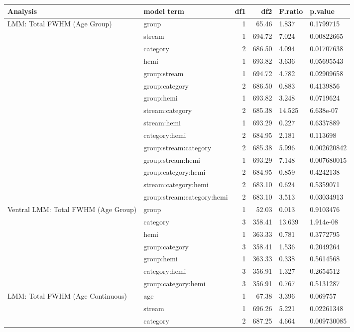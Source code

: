 \begin{table}
\centering
\begin{tabular}{llrrll}
\toprule
Analysis & model term & df1 & df2 & F.ratio & p.value\\
\midrule
LMM: Total FWHM (Age Group) & group & 1 & 65.46 & 1.837 & 0.1799715\\
 & stream & 1 & 694.72 & 7.024 & 0.00822665\\
 & category & 2 & 686.50 & 4.094 & 0.01707638\\
 & hemi & 1 & 693.82 & 3.636 & 0.05695543\\
 & group:stream & 1 & 694.72 & 4.782 & 0.02909658\\
\addlinespace
 & group:category & 2 & 686.50 & 0.883 & 0.4139856\\
 & group:hemi & 1 & 693.82 & 3.248 & 0.0719624\\
 & stream:category & 2 & 685.38 & 14.525 & 6.638e-07\\
 & stream:hemi & 1 & 693.29 & 0.227 & 0.6337889\\
 & category:hemi & 2 & 684.95 & 2.181 & 0.113698\\
\addlinespace
 & group:stream:category & 2 & 685.38 & 5.996 & 0.002620842\\
 & group:stream:hemi & 1 & 693.29 & 7.148 & 0.007680015\\
 & group:category:hemi & 2 & 684.95 & 0.859 & 0.4242138\\
 & stream:category:hemi & 2 & 683.10 & 0.624 & 0.5359071\\
 & group:stream:category:hemi & 2 & 683.10 & 3.513 & 0.03034913\\
\addlinespace
Ventral LMM: Total FWHM (Age Group) & group & 1 & 52.03 & 0.013 & 0.9103476\\
 & category & 3 & 358.41 & 13.639 & 1.914e-08\\
 & hemi & 1 & 363.33 & 0.781 & 0.3772795\\
 & group:category & 3 & 358.41 & 1.536 & 0.2049264\\
 & group:hemi & 1 & 363.33 & 0.338 & 0.5614568\\
\addlinespace
 & category:hemi & 3 & 356.91 & 1.327 & 0.2654512\\
 & group:category:hemi & 3 & 356.91 & 0.767 & 0.5131287\\
LMM: Total FWHM (Age Continuous) & age & 1 & 67.38 & 3.396 & 0.069757\\
 & stream & 1 & 696.26 & 5.221 & 0.02261348\\
 & category & 2 & 687.25 & 4.664 & 0.009730085\\

\end{tabular}
\end{table}
